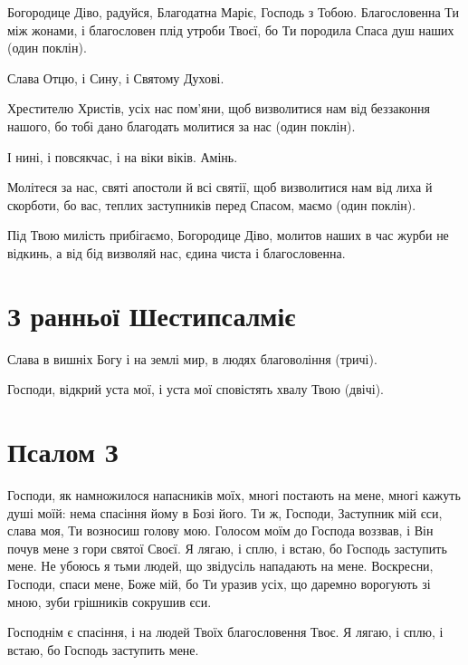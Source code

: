 \documentclass[chapters.tex]{subfiles}
\begin{document}
Богородице Діво, радуйся, Благодатна Маріє, Господь з Тобою. Благословенна Ти між жонами, і благословен плід утроби Твоєї, бо Ти породила Спаса душ наших (один поклін).

Слава Отцю, і Сину, і Святому Духові.

Хрестителю Христів, усіх нас пом’яни, щоб визволитися нам від беззаконня нашого, бо тобі дано благодать молитися за нас (один поклін).

І нині, і повсякчас, і на віки віків. Амінь.

Молітеся за нас, святі апостоли й всі святії, щоб визволитися нам від лиха й скорботи, бо вас, теплих заступників перед Спасом, маємо (один поклін).

Під Твою милість прибігаємо, Богородице Діво, молитов наших в час журби не відкинь, а від бід визволяй нас, єдина чиста і благословенна.

\section{З ранньої Шестипсалміє}
Слава в вишніх Богу і на землі мир, в людях благовоління (тричі).

Господи, відкрий уста мої, і уста мої сповістять хвалу Твою (двічі).

\section{Псалом З}
Господи, як намножилося напасників моїх, многі постають на мене, многі кажуть душі моїй: нема спасіння йому в Бозі його. Ти ж, Господи, Заступник мій єси, слава моя, Ти возносиш голову мою. Голосом моїм до Господа воззвав, і Він почув мене з гори святої Своєї. Я лягаю, і сплю, і встаю, бо Господь заступить мене. Не убоюсь я тьми людей, що звідусіль нападають на мене. Воскресни, Господи, спаси мене, Боже мій, бо Ти уразив усіх, що даремно ворогують зі мною, зуби грішників сокрушив єси.

Господнім є спасіння, і на людей Твоїх благословення Твоє. Я лягаю, і сплю, і встаю, бо Господь заступить мене.
\end{document}
